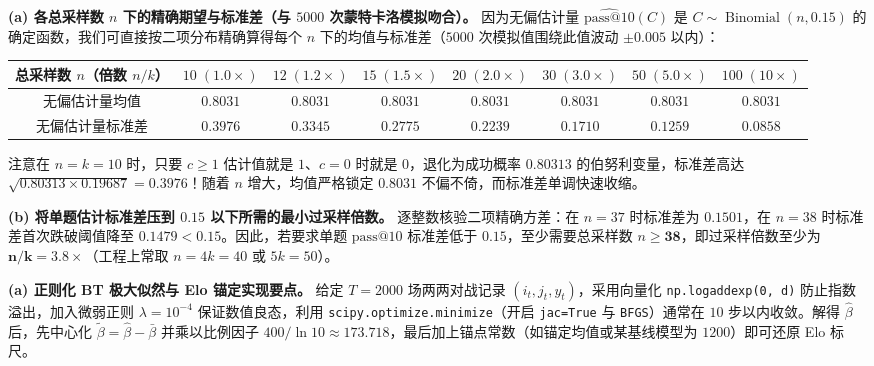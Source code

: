 \textbf{(a) 各总采样数 $n$ 下的精确期望与标准差（与 $5000$ 次蒙特卡洛模拟吻合）。}
因为无偏估计量 $\widehat{\mathrm{pass@}10}(C)$ 是 $C \sim \operatorname{Binomial}(n, 0.15)$ 的确定函数，我们可直接按二项分布精确算得每个 $n$ 下的均值与标准差（$5000$ 次模拟值围绕此值波动 $\pm 0.005$ 以内）：
\begin{center}
\footnotesize
\begin{tabular}{cccccccc}
\toprule
总采样数 $n$（倍数 $n/k$） & $10\;(1.0\times)$ & $12\;(1.2\times)$ & $15\;(1.5\times)$ & $20\;(2.0\times)$ & $30\;(3.0\times)$ & $50\;(5.0\times)$ & $100\;(10\times)$ \\
\midrule
无偏估计量均值 & $0.8031$ & $0.8031$ & $0.8031$ & $0.8031$ & $0.8031$ & $0.8031$ & $0.8031$ \\
无偏估计量标准差 & $\mathbf{0.3976}$ & $0.3345$ & $0.2775$ & $0.2239$ & $0.1710$ & $\mathbf{0.1259}$ & $0.0858$ \\
\bottomrule
\end{tabular}
\end{center}
注意在 $n = k = 10$ 时，只要 $c \ge 1$ 估计值就是 $1$、$c = 0$ 时就是 $0$，退化为成功概率 $0.80313$ 的伯努利变量，标准差高达 $\sqrt{0.80313 \times 0.19687} = \mathbf{0.3976}$！随着 $n$ 增大，均值严格锁定 $0.8031$ 不偏不倚，而标准差单调快速收缩。

\textbf{(b) 将单题估计标准差压到 $0.15$ 以下所需的最小过采样倍数。}
逐整数核验二项精确方差：在 $n = 37$ 时标准差为 $0.1501$，在 $n = 38$ 时标准差首次跌破阈值降至 $\mathbf{0.1479} < 0.15$。因此，若要求单题 $\mathrm{pass@}10$ 标准差低于 $0.15$，至少需要总采样数 $n \ge \mathbf{38}$，即过采样倍数至少为 $\mathbf{n/k = 3.8\times}$（工程上常取 $n = 4k = 40$ 或 $5k = 50$）。


\textbf{(a) 正则化 BT 极大似然与 Elo 锚定实现要点。}
给定 $T = 2000$ 场两两对战记录 $(i_t, j_t, y_t)$，采用向量化 \texttt{np.logaddexp(0, d)} 防止指数溢出，加入微弱正则 $\lambda = 10^{-4}$ 保证数值良态，利用 \texttt{scipy.\allowbreak optimize.\allowbreak minimize}（开启 \texttt{jac=True} 与 \texttt{BFGS}）通常在 $10$ 步以内收敛。解得 $\hat{\beta}$ 后，先中心化 $\tilde{\beta} = \hat{\beta} - \bar{\beta}$ 并乘以比例因子 $400/\ln 10 \approx 173.718$，最后加上锚点常数（如锚定均值或某基线模型为 $1200$）即可还原 Elo 标尺。

